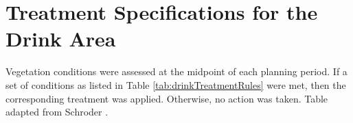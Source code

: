 
\chapter{Treatment Specifications for the Drink Area}
\label{chap:appBTreatmentSpec}

Vegetation conditions were assessed at the midpoint of each planning period. If a set of conditions as listed in Table \ref{tab:drinkTreatmentRules} were met, then the corresponding treatment was applied. Otherwise, no action was taken. Table adapted from Schroder \cite{schroder2016multi}.


